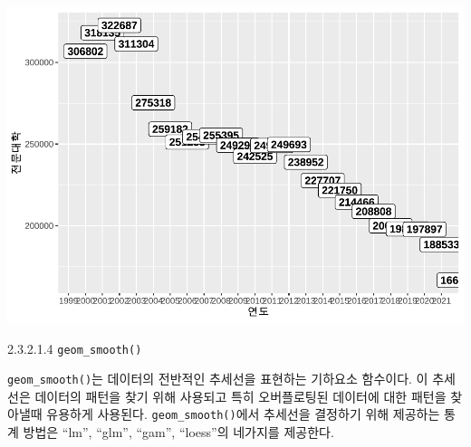 \documentclass[
]{article}
\begin{document}
\includegraphics{chap3_files/figure-latex/unnamed-chunk-32-2.pdf}

2.3.2.1.4 \texttt{geom\_smooth()}

\texttt{geom\_smooth()}는 데이터의 전반적인 추세선을 표현하는 기하요소 함수이다. 이 추세선은 데이터의 패턴을 찾기 위해 사용되고 특히 오버플로팅된 데이터에 대한 패턴을 찾아낼때 유용하게 사용된다. \texttt{geom\_smooth()}에서 추세선을 결정하기 위해 제공하는 통계 방법은 ``lm'', ``glm'', ``gam'', ``loess''의 네가지를 제공한다.
\end{document}
